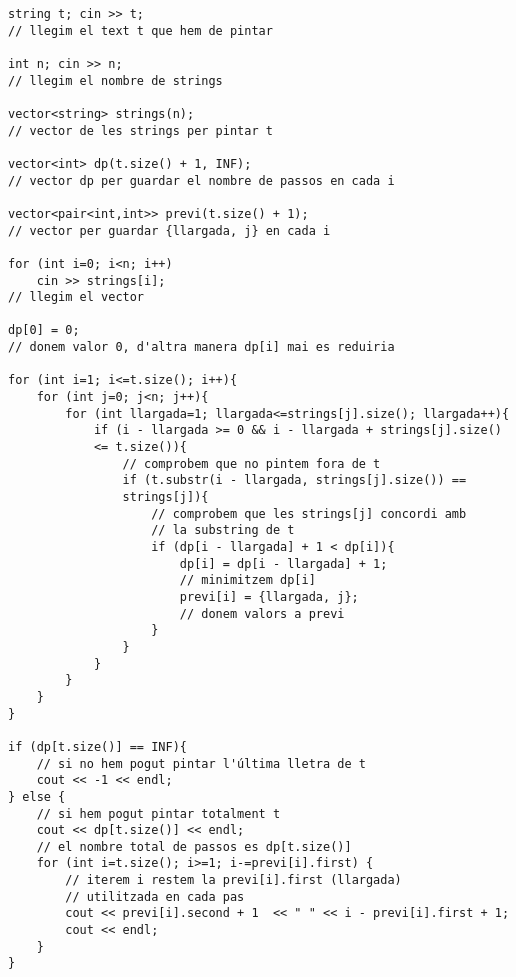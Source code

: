 \begin{lstlisting}
string t; cin >> t;
// llegim el text t que hem de pintar

int n; cin >> n;
// llegim el nombre de strings

vector<string> strings(n);
// vector de les strings per pintar t

vector<int> dp(t.size() + 1, INF);
// vector dp per guardar el nombre de passos en cada i

vector<pair<int,int>> previ(t.size() + 1);
// vector per guardar {llargada, j} en cada i

for (int i=0; i<n; i++)
    cin >> strings[i];
// llegim el vector

dp[0] = 0;
// donem valor 0, d'altra manera dp[i] mai es reduiria

for (int i=1; i<=t.size(); i++){
    for (int j=0; j<n; j++){
        for (int llargada=1; llargada<=strings[j].size(); llargada++){
            if (i - llargada >= 0 && i - llargada + strings[j].size() 
            <= t.size()){
                // comprobem que no pintem fora de t
                if (t.substr(i - llargada, strings[j].size()) ==
                strings[j]){
                    // comprobem que les strings[j] concordi amb 
                    // la substring de t
                    if (dp[i - llargada] + 1 < dp[i]){
                        dp[i] = dp[i - llargada] + 1;
                        // minimitzem dp[i]
                        previ[i] = {llargada, j};
                        // donem valors a previ
                    }
                }
            }
        }
    }
}

if (dp[t.size()] == INF){
    // si no hem pogut pintar l'última lletra de t
    cout << -1 << endl;
} else {
    // si hem pogut pintar totalment t
    cout << dp[t.size()] << endl;
    // el nombre total de passos es dp[t.size()]
    for (int i=t.size(); i>=1; i-=previ[i].first) {
        // iterem i restem la previ[i].first (llargada) 
        // utilitzada en cada pas
        cout << previ[i].second + 1  << " " << i - previ[i].first + 1;
        cout << endl;
    }
}
\end{lstlisting}









